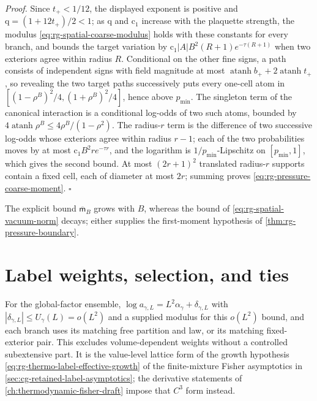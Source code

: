 \noindent\emph{Proof.}
Since $t_+<1/12$, the displayed exponent is positive and
$\mathrm q=(1+12t_+)/2<1$; as $\mathrm q$ and $\mathrm c_1$ increase with the plaquette strength, the
modulus \cref{eq:rg-spatial-coarse-modulus} holds with these constants for
every branch, and bounds the target variation by
$\mathrm c_1|A|B^2(R+1)e^{-\tau(R+1)}$ when two exteriors agree within radius $R$.
Conditional on the other fine signs, a path consists of independent signs
with field magnitude at most $\operatorname{atanh}b_++2\operatorname{atanh}t_+$,
so revealing the two target paths successively puts every one-cell atom in
$[(1-\rho^B)^2/4,(1+\rho^B)^2/4]$, hence above $p_{\min}$. The singleton
term of the canonical interaction is a conditional log-odds of two such atoms,
bounded by $4\operatorname{atanh}\rho^B\leq4\rho^B/(1-\rho^2)$. The radius-$r$
term is the difference of two successive log-odds whose exteriors agree
within radius $r-1$; each of the two probabilities moves by at most
$\mathrm c_1B^2re^{-\tau r}$, and the logarithm is $1/p_{\min}$-Lipschitz on
$[p_{\min},1]$, which gives the second bound. At most $(2r+1)^2$
translated radius-$r$ supports contain a fixed cell, each of diameter at most
$2r$; summing proves \cref{eq:rg-pressure-coarse-moment}. $\square$

The explicit bound $\overline{\mathsf m}_B$ grows with $B$, whereas the bound of
\cref{eq:rg-spatial-vacuum-norm} decays; either supplies the first-moment
hypothesis of \cref{thm:rg-pressure-boundary}.

\section{Label weights, selection, and ties}
\label{sec:rg-pressure-selection}

For the global-factor ensemble,
$\log a_{\gamma,L}=L^2\alpha_\gamma+\delta_{\gamma,L}$ with
$|\delta_{\gamma,L}|\leq U_\gamma(L)=o(L^2)$ and a supplied modulus for this
$o(L^2)$ bound, and each branch uses its matching free partition and law, or
its matching fixed-exterior pair. This excludes volume-dependent weights
without a controlled subextensive part. It is the value-level lattice form of
the growth hypothesis \cref{eq:rg-thermo-label-effective-growth} of the
finite-mixture Fisher asymptotics in \cref{sec:cg-retained-label-asymptotics};
the derivative statements of \cref{ch:thermodynamic-fisher-draft} impose that
$C^3$ form instead.

